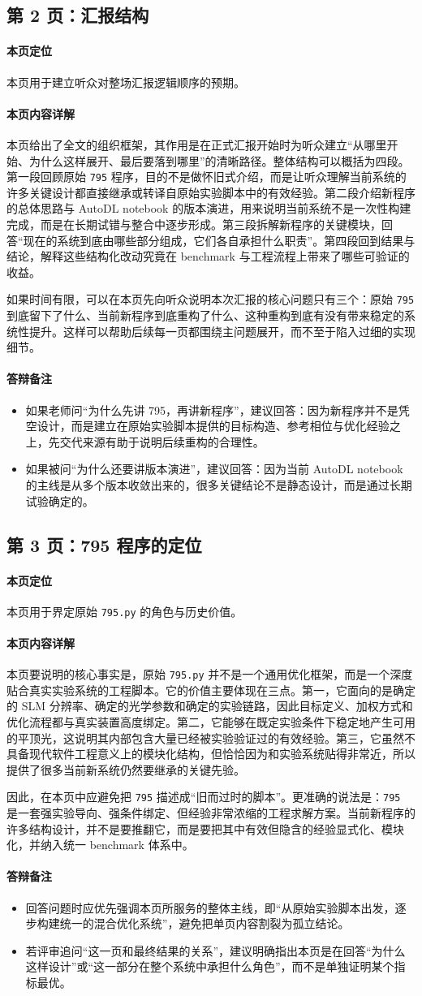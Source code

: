 \documentclass[12pt,a4paper]{ctexart}
\newcommand{\pageentry}[4]{
\subsection{第 #1 页：#2}

\paragraph{本页定位}
#3

\paragraph{本页内容详解}
#4

\paragraph{答辩备注}
\begin{itemize}
\item 回答问题时应优先强调本页所服务的整体主线，即“从原始实验脚本出发，逐步构建统一的混合优化系统”，避免把单页内容割裂为孤立结论。
\item 若评审追问“这一页和最终结果的关系”，建议明确指出本页是在回答“为什么这样设计”或“这一部分在整个系统中承担什么角色”，而不是单独证明某个指标最优。
\end{itemize}
}
\begin{document}
\subsection{第 2 页：汇报结构}

\paragraph{本页定位}
本页用于建立听众对整场汇报逻辑顺序的预期。

\paragraph{本页内容详解}
本页给出了全文的组织框架，其作用是在正式汇报开始时为听众建立“从哪里开始、为什么这样展开、最后要落到哪里”的清晰路径。整体结构可以概括为四段。第一段回顾原始 \texttt{795} 程序，目的不是做怀旧式介绍，而是让听众理解当前系统的许多关键设计都直接继承或转译自原始实验脚本中的有效经验。第二段介绍新程序的总体思路与 AutoDL notebook 的版本演进，用来说明当前系统不是一次性构建完成，而是在长期试错与整合中逐步形成。第三段拆解新程序的关键模块，回答“现在的系统到底由哪些部分组成，它们各自承担什么职责”。第四段回到结果与结论，解释这些结构化改动究竟在 benchmark 与工程流程上带来了哪些可验证的收益。

如果时间有限，可以在本页先向听众说明本次汇报的核心问题只有三个：原始 \texttt{795} 到底留下了什么、当前新程序到底重构了什么、这种重构到底有没有带来稳定的系统性提升。这样可以帮助后续每一页都围绕主问题展开，而不至于陷入过细的实现细节。

\paragraph{答辩备注}
\begin{itemize}
\item 如果老师问“为什么先讲 795，再讲新程序”，建议回答：因为新程序并不是凭空设计，而是建立在原始实验脚本提供的目标构造、参考相位与优化经验之上，先交代来源有助于说明后续重构的合理性。
\item 如果被问“为什么还要讲版本演进”，建议回答：因为当前 AutoDL notebook 的主线是从多个版本收敛出来的，很多关键结论不是静态设计，而是通过长期试验确定的。
\end{itemize}

\pageentry{3}{795 程序的定位}{
本页用于界定原始 \texttt{795.py} 的角色与历史价值。
}{
本页要说明的核心事实是，原始 \texttt{795.py} 并不是一个通用优化框架，而是一个深度贴合真实实验系统的工程脚本。它的价值主要体现在三点。第一，它面向的是确定的 SLM 分辨率、确定的光学参数和确定的实验链路，因此目标定义、加权方式和优化流程都与真实装置高度绑定。第二，它能够在既定实验条件下稳定地产生可用的平顶光，这说明其内部包含大量已经被实验验证过的有效经验。第三，它虽然不具备现代软件工程意义上的模块化结构，但恰恰因为和实验系统贴得非常近，所以提供了很多当前新系统仍然要继承的关键先验。

因此，在本页中应避免把 \texttt{795} 描述成“旧而过时的脚本”。更准确的说法是：\texttt{795} 是一套强实验导向、强条件绑定、但经验非常浓缩的工程求解方案。当前新程序的许多结构设计，并不是要推翻它，而是要把其中有效但隐含的经验显式化、模块化，并纳入统一 benchmark 体系中。
}
\end{document}

